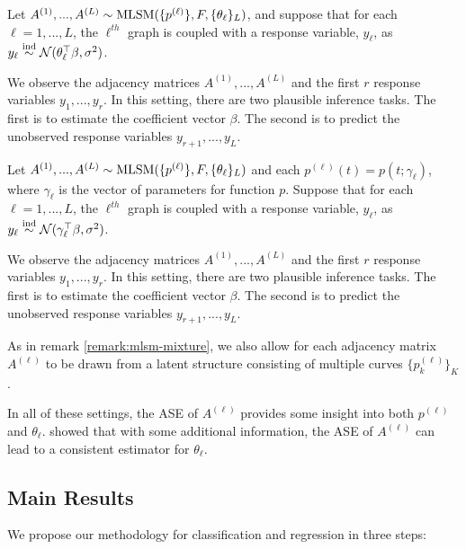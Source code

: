 \documentclass[12pt]{article}
\begin{document}
\begin{definition}
\label{def:mlsm-r-1}
Let $A^{(1)}, ..., A^{(L)} \sim \mathrm{MLSM}(\{p^{(\ell)}\}, F, \{\theta_\ell\}_L)$, and suppose that for each $\ell = 1, ..., L$, the $\ell^{th}$ graph is coupled with a response variable, $y_\ell$, as $y_\ell \stackrel{\mathrm{ind}}{\sim} \mathcal{N}(\theta_\ell^\top \beta, \sigma^2)$. 

We observe the adjacency matrices $A^{(1)}, ..., A^{(L)}$ and the first $r$ response variables $y_1, ..., y_r$. 
In this setting, there are two plausible inference tasks. 
The first is to estimate the coefficient vector $\beta$. 
The second is to predict the unobserved response variables $y_{r+1}, ..., y_L$. 
\end{definition}

\begin{definition}
\label{def:mlsm-r-2}
Let $A^{(1)}, ..., A^{(L)} \sim \mathrm{MLSM}(\{p^{(\ell)}\}, F, \{\theta_\ell\}_L)$ and each $p^{(\ell)}(t) = p(t; \gamma_\ell)$, where $\gamma_\ell$ is the vector of parameters for function $p$. 
Suppose that for each $\ell = 1, ..., L$, the $\ell^{th}$ graph is coupled with a response variable, $y_\ell$, as $y_\ell \stackrel{\mathrm{ind}}{\sim} \mathcal{N}(\gamma_\ell^\top \beta, \sigma^2)$. 

We observe the adjacency matrices $A^{(1)}, ..., A^{(L)}$ and the first $r$ response variables $y_1, ..., y_r$. 
In this setting, there are two plausible inference tasks. 
The first is to estimate the coefficient vector $\beta$. 
The second is to predict the unobserved response variables $y_{r+1}, ..., y_L$. 

As in remark \ref{remark:mlsm-mixture}, we also allow for each adjacency matrix $A^{(\ell)}$ to be drawn from a latent structure consisting of multiple curves $\{p^{(\ell)}_k\}_K$. 
\end{definition}

In all of these settings, the ASE of \(A^{(\ell)}\) provides some
insight into both \(p^{(\ell)}\) and \(\theta_\ell\).
\citet{athreya2020estimation} showed that with some additional
information, the ASE of \(A^{(\ell)}\) can lead to a consistent
estimator for \(\theta_\ell\).

\subsection{Main Results}\label{main-results}

We propose our methodology for classification and regression in three
steps:
\end{document}
